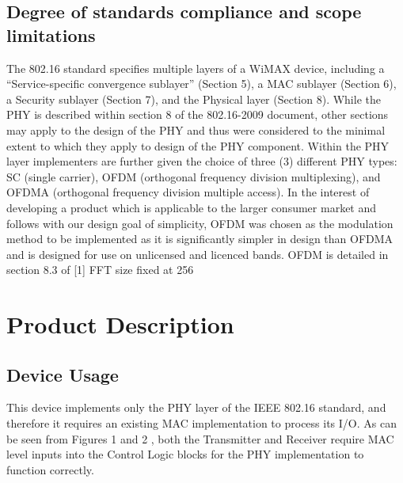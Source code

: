 \documentclass[10pt]{article}
\begin{document}
\subsection{Degree of standards compliance and scope limitations}
The 802.16 standard specifies multiple layers of a WiMAX device, including a “Service-specific convergence sublayer” (Section 5), a MAC sublayer (Section 6), a Security sublayer (Section 7), and the Physical layer (Section 8). While the PHY is described within section 8 of the 802.16-2009 document, other sections may apply to the design of the PHY and thus were considered to the minimal extent to which they apply to design of the PHY component.
Within the PHY layer implementers are further given the choice of three (3) different PHY types: SC (single carrier), OFDM (orthogonal frequency division multiplexing), and OFDMA (orthogonal frequency division multiple access). In the interest of developing a product which is applicable to the larger consumer market and follows with our design goal of simplicity, OFDM was chosen as the modulation method to be implemented as it is significantly simpler in design than OFDMA and is designed for use on unlicensed and licenced bands. OFDM is detailed in section 8.3 of [1]
FFT size fixed at 256
\newpage
\section{Product Description}
\subsection{Device Usage}
This device implements only the PHY layer of the IEEE 802.16 standard, and therefore it requires an existing MAC implementation to process its I/O. As can be seen from Figures 1 and 2 %
, both the Transmitter and Receiver require MAC level inputs into the Control Logic blocks for the PHY implementation to function correctly.
\end{document}
